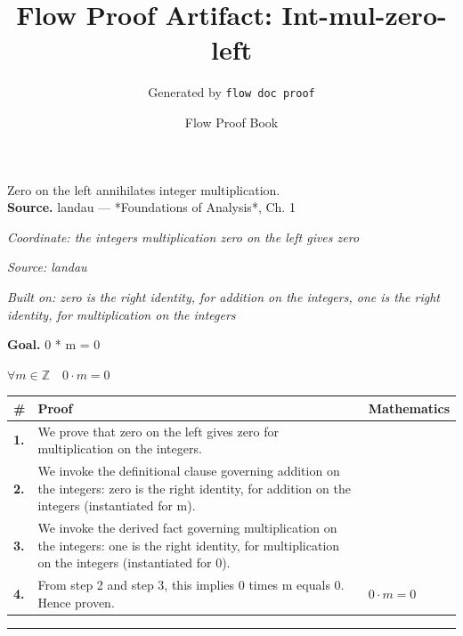 \documentclass[11pt]{article}
\title{Flow Proof Artifact: Int-mul-zero-left}
\author{Generated by \texttt{flow doc proof}}
\date{Flow Proof Book}
\theoremstyle{definition}
\begin{document}
\maketitle
Zero on the left annihilates integer multiplication.\\[0.5em]
\textbf{Source.} landau — *Foundations of Analysis*, Ch. 1\\[0.5em]
\bigskip
{}\par
\smallskip\noindent\textit{Coordinate: the integers \cdot multiplication \cdot zero on the left gives zero}\par
\smallskip\noindent\textit{Source: landau}\par
\smallskip\noindent\textit{Built on: zero is the right identity, for addition on the integers, one is the right identity, for multiplication on the integers}\par
\medskip
\noindent\textbf{Goal.} 0 * m = 0\par
\noindent$\displaystyle \forall m \in \mathbb{Z}\quad 0 \cdot m = 0$\par
\medskip
\noindent
\begin{tabular}{@{} >{\raggedright\arraybackslash}p{} >{\raggedright\arraybackslash}p{} >{\raggedleft\arraybackslash}p{} @{}}
\textbf{\#} & \textbf{Proof} & \textbf{Mathematics} \\
\midrule
\textbf{1.} & We prove that zero on the left gives zero for multiplication on the integers. & \\[0.45em]
\textbf{2.} & We invoke the definitional clause governing addition on the integers: zero is the right identity, for addition on the integers (instantiated for m). & \\[0.45em]
\textbf{3.} & We invoke the derived fact governing multiplication on the integers: one is the right identity, for multiplication on the integers (instantiated for 0). & \\[0.45em]
\textbf{4.} & From step 2 and step 3, this implies 0 times m equals 0. Hence proven. & $\displaystyle 0 \cdot m = 0$ \\[0.45em]
\bottomrule
\end{tabular}
\label{thm:Int-multiplication-zero_on_the_left_gives_zero}
\par\medskip\hrule
\end{document}
